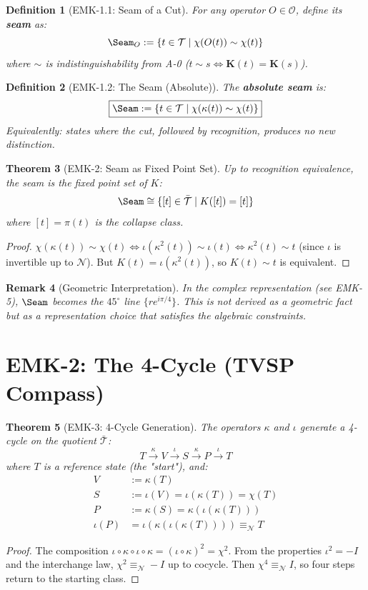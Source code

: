 \documentclass[12pt, oneside]{article}
\newtheorem{theorem}{Theorem}[section]
\newtheorem{definition}[theorem]{Definition}
\newtheorem{remark}[theorem]{Remark}
\newcommand{\K}{\mathbf{K}}
\newcommand{\N}{\mathcal{N}}
\newcommand{\T}{\mathcal{T}}
\newcommand{\Opr}{\mathcal{O}}
\begin{document}
\begin{definition}[EMK-1.1: Seam of a Cut]
For any operator $O \in \Opr$, define its \textbf{seam} as:
\[
\Seam_O := \{ t \in \T \mid \chi(O(t)) \sim \chi(t) \}
\]
where $\sim$ is indistinguishability from A-0 ($t \sim s \iff \K(t) = \K(s)$).
\end{definition}

\begin{definition}[EMK-1.2: The Seam (Absolute)]
The \textbf{absolute seam} is:
\[
\boxed{\Seam := \{ t \in \T \mid \chi(\kappa(t)) \sim \chi(t) \}}
\]
Equivalently: states where the cut, followed by recognition, produces no new distinction.
\end{definition}

\begin{theorem}[EMK-2: Seam as Fixed Point Set]
Up to recognition equivalence, the seam is the fixed point set of $K$:
\[
\Seam \cong \{ [t] \in \bar{\T} \mid K([t]) = [t] \}
\]
where $[t] = \pi(t)$ is the collapse class.
\end{theorem}
\begin{proof}
$\chi(\kappa(t)) \sim \chi(t) \iff \iota(\kappa^2(t)) \sim \iota(t) \iff \kappa^2(t) \sim t$ (since $\iota$ is invertible up to $\N$). But $K(t) = \iota(\kappa^2(t))$, so $K(t) \sim t$ is equivalent.
\end{proof}

\begin{remark}[Geometric Interpretation]
In the complex representation (see EMK-5), $\Seam$ becomes the $45^\circ$ line $\{re^{i\pi/4}\}$. This is not derived as a geometric fact but as a representation choice that satisfies the algebraic constraints.
\end{remark}

\section{EMK-2: The 4-Cycle (TVSP Compass)}

\begin{theorem}[EMK-3: 4-Cycle Generation]
The operators $\kappa$ and $\iota$ generate a 4-cycle on the quotient $\bar{\T}$:
\[
T \xrightarrow{\kappa} V \xrightarrow{\iota} S \xrightarrow{\kappa} P \xrightarrow{\iota} T
\]
where $T$ is a reference state (the "start"), and:
\begin{align*}
V &:= \kappa(T) \\
S &:= \iota(V) = \iota(\kappa(T)) = \chi(T) \\
P &:= \kappa(S) = \kappa(\iota(\kappa(T))) \\
\iota(P) &= \iota(\kappa(\iota(\kappa(T)))) \equiv_\N T
\end{align*}
\end{theorem}
\begin{proof}
The composition $\iota \circ \kappa \circ \iota \circ \kappa = (\iota \circ \kappa)^2 = \chi^2$. From the properties $\iota^2 = -I$ and the interchange law, $\chi^2 \equiv_\N -I$ up to cocycle. Then $\chi^4 \equiv_\N I$, so four steps return to the starting class.
\end{proof}
\end{document}
